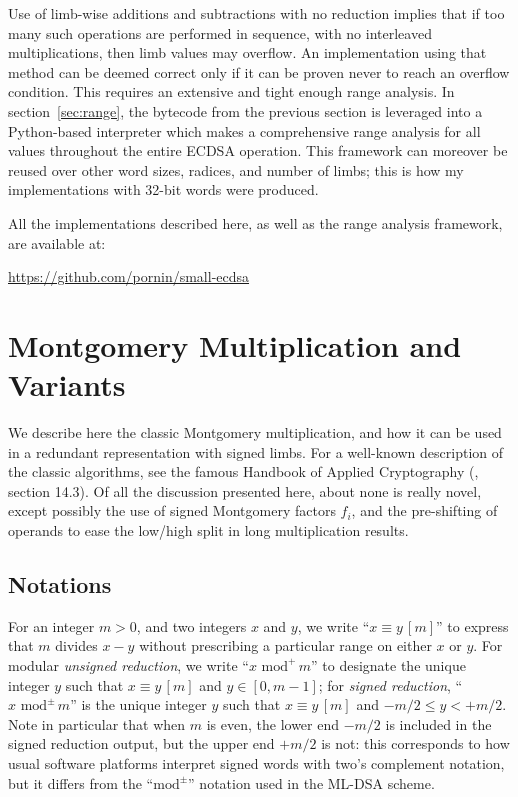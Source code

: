 \documentclass{llncs}
\newcommand{\eqvm}[3]{#1 \equiv #2 \,[#3]}
\newcommand{\umod}[2]{#1 \,\,\text{mod}^{+}\, #2}
\newcommand{\smod}[2]{#1 \,\,\text{mod}^{\pm}\, #2}
\begin{document}
Use of limb-wise additions and subtractions with no reduction implies
that if too many such operations are performed in sequence, with no
interleaved multiplications, then limb values may overflow. An
implementation using that method can be deemed correct only if it can be
proven never to reach an overflow condition. This requires an extensive
and tight enough range analysis. In section~\ref{sec:range}, the
bytecode from the previous section is leveraged into a Python-based
interpreter which makes a comprehensive range analysis for all values
throughout the entire ECDSA operation. This framework can moreover be
reused over other word sizes, radices, and number of limbs; this is how
my implementations with 32-bit words were produced.

All the implementations described here, as well as the range analysis
framework, are available at:
\begin{center}
    \url{https://github.com/pornin/small-ecdsa}
\end{center}


\newpage
\section{Montgomery Multiplication and Variants}\label{sec:montymul}

We describe here the classic Montgomery multiplication, and how it can
be used in a redundant representation with signed limbs. For a
well-known description of the classic algorithms, see the famous
Handbook of Applied Cryptography (\cite{MenOorVan1996}, section 14.3).
Of all the discussion presented here, about none is really novel, except
possibly the use of signed Montgomery factors $f_i$, and the
pre-shifting of operands to ease the low/high split in long
multiplication results.

\subsection{Notations}

For an integer $m > 0$, and two integers $x$ and $y$, we write
``$\eqvm{x}{y}{m}$'' to express that $m$ divides $x - y$ without
prescribing a particular range on either $x$ or $y$. For modular
\emph{unsigned reduction}, we write ``$\umod{x}{m}$'' to designate the
unique integer $y$ such that $\eqvm{x}{y}{m}$ and $y \in [0, m-1]$; for
\emph{signed reduction}, ``$\smod{x}{m}$'' is the unique integer $y$
such that $\eqvm{x}{y}{m}$ and $-m/2 \leq y < +m/2$. Note in particular
that when $m$ is even, the lower end $-m/2$ is included in the signed
reduction output, but the upper end $+m/2$ is not: this corresponds to
how usual software platforms interpret signed words with two's
complement notation, but it differs from the ``$\text{mod}^\pm$''
notation used in the ML-DSA scheme.
\end{document}
